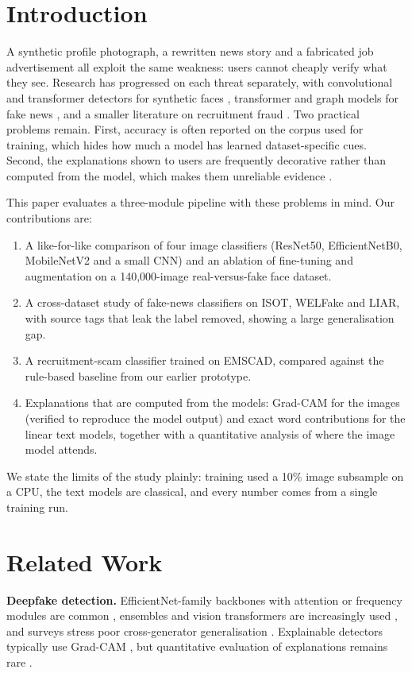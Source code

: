 \documentclass[runningheads]{llncs}
\begin{document}
\section{Introduction}
A synthetic profile photograph, a rewritten news story and a fabricated job advertisement all exploit the same weakness: users cannot cheaply verify what they see. Research has progressed on each threat separately, with convolutional and transformer detectors for synthetic faces \cite{r02,r04,r10}, transformer and graph models for fake news \cite{r27,r32}, and a smaller literature on recruitment fraud \cite{r37,r38}. Two practical problems remain. First, accuracy is often reported on the corpus used for training, which hides how much a model has learned dataset-specific cues. Second, the explanations shown to users are frequently decorative rather than computed from the model, which makes them unreliable evidence \cite{r19}.

This paper evaluates a three-module pipeline with these problems in mind. Our contributions are:
\begin{enumerate}
\item A like-for-like comparison of four image classifiers (ResNet50, EfficientNetB0, MobileNetV2 and a small CNN) and an ablation of fine-tuning and augmentation on a 140,000-image real-versus-fake face dataset.
\item A cross-dataset study of fake-news classifiers on ISOT, WELFake and LIAR, with source tags that leak the label removed, showing a large generalisation gap.
\item A recruitment-scam classifier trained on EMSCAD, compared against the rule-based baseline from our earlier prototype.
\item Explanations that are computed from the models: Grad-CAM for the images (verified to reproduce the model output) and exact word contributions for the linear text models, together with a quantitative analysis of where the image model attends.
\end{enumerate}
We state the limits of the study plainly: training used a 10\% image subsample on a CPU, the text models are classical, and every number comes from a single training run.

\section{Related Work}
\textbf{Deepfake detection.} EfficientNet-family backbones with attention or frequency modules are common \cite{r02,r04}, ensembles and vision transformers are increasingly used \cite{r05,r10}, and surveys stress poor cross-generator generalisation \cite{r08,r09,r18}. Explainable detectors typically use Grad-CAM \cite{r07,r13,r39,gradcam}, but quantitative evaluation of explanations remains rare \cite{r19}.
\end{document}
